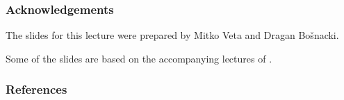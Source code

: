 \documentclass[notes]{beamer}          %
\begin{document}
\begin{frame}
\frametitle{Acknowledgements}

The slides for this lecture were prepared by Mitko Veta and Dragan Bo{\v s}nacki. 

Some of the slides are based on the accompanying lectures of \cite{deeplearning}.

\end{frame}


\begin{frame}
\frametitle{References}
\printbibliography
\end{frame}
\end{document}

